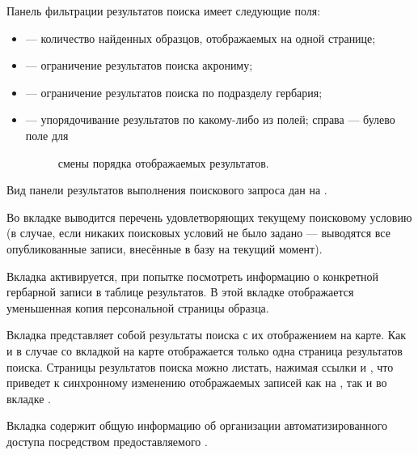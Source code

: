 \documentclass[letterpaper,10pt,russian]{sphinxmanual}
\begin{document}
Панель фильтрации результатов поиска имеет следующие поля:
\begin{itemize}
\item {} 
 —  количество найденных образцов, отображаемых на одной странице;

\item {} 
 —  ограничение результатов поиска акрониму;

\item {} 
 —  ограничение результатов поиска по подразделу гербария;

\item {} \begin{description}
\item[{ —  упорядочивание результатов по какому-либо из полей; справа — булево поле для}] \leavevmode
смены порядка отображаемых результатов.

\end{description}

\end{itemize}

Вид панели результатов выполнения поискового запроса дан на {\hyperref[\detokenize{search_basics:fig3}]{}}.

Во вкладке  выводится перечень удовлетворяющих текущему поисковому условию
(в случае, если никаких поисковых условий не было задано — выводятся все опубликованные записи,
внесённые в базу на текущий момент).

Вкладка  активируется, при попытке посмотреть
информацию о конкретной гербарной записи в таблице результатов.
В этой вкладке отображается уменьшенная копия персональной страницы образца.

Вкладка  представляет собой результаты поиска с их отображением на карте.
Как и в случае со вкладкой  на карте отображается
только одна страница результатов поиска. Страницы результатов поиска можно листать,
нажимая ссылки  и , что приведет
к синхронному изменению отображаемых записей как на ,
так и во вкладке .

Вкладка  содержит общую информацию об организации автоматизированного
доступа посредством предоставляемого {\hyperref[\detokenize{http_api::doc}]{}}.
\end{document}

